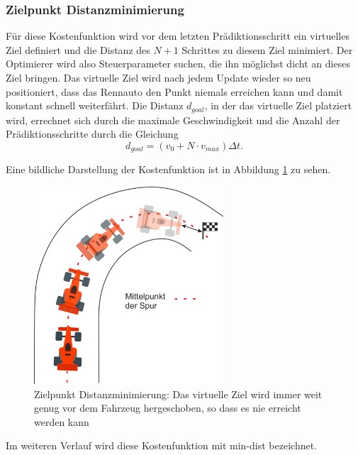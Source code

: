 \documentclass{like}
\begin{document}
\subsubsection*{Zielpunkt Distanzminimierung}
Für diese Kostenfunktion wird vor dem letzten Prädiktionsschritt ein virtuelles Ziel definiert und die Distanz des $N+1$ Schrittes zu diesem Ziel minimiert. Der Optimierer wird also Steuerparameter suchen, die ihn möglichst dicht an dieses Ziel bringen. Das virtuelle Ziel wird nach jedem Update wieder so neu positioniert, dass das Rennauto den Punkt niemals erreichen kann und damit konstant schnell weiterfährt. Die Distanz $d_{goal}$, in der das virtuelle Ziel platziert wird, errechnet sich durch die maximale Geschwindigkeit und die Anzahl der Prädiktionsschritte durch die Gleichung 
\begin{equation}
d_{goal} = \left(v_0 + N \cdot v_{max} \right) \Delta t.
\end{equation}


Eine bildliche Darstellung der Kostenfunktion ist in Abbildung \ref{fig:costGoalDist} zu sehen. 

\begin{figure}[ht!]
	\centering
	\includegraphics[width=200pt]{Abbildungen/costGoalDist.png}
	\caption{Zielpunkt Distanzminimierung: Das virtuelle Ziel wird immer weit genug vor dem Fahrzeug hergeschoben, so dass es nie erreicht werden kann}
	\label{fig:costGoalDist}
\end{figure}
Im weiteren Verlauf wird diese Kostenfunktion mit min-dist bezeichnet.
\end{document}
